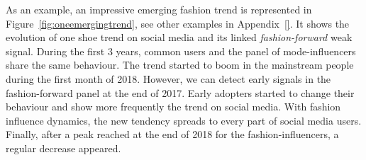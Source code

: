 \documentclass{article} %
\begin{document}














As an example, an impressive emerging fashion trend is represented in Figure~\ref{fig:oneemergingtrend}, see other examples in Appendix~\ref{}. It shows the evolution of one shoe trend on social media and its linked \textit{fashion-forward} weak signal. During the first 3 years, common users and the panel of mode-influencers share the same behaviour. The trend started to boom in the mainstream people during the first month of 2018. However, we can detect early signals in the fashion-forward panel at the end of 2017. Early adopters started to change their behaviour and show more frequently the trend on social media. With fashion influence dynamics, the new tendency spreads to every part of social media users. Finally, after a peak reached at the end of 2018 for the fashion-influencers, a regular decrease appeared. %
\end{document}

